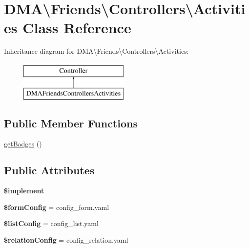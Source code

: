 \hypertarget{classDMA_1_1Friends_1_1Controllers_1_1Activities}{}\section{D\+M\+A\textbackslash{}Friends\textbackslash{}Controllers\textbackslash{}Activities Class Reference}
\label{classDMA_1_1Friends_1_1Controllers_1_1Activities}
Inheritance diagram for D\+M\+A\textbackslash{}Friends\textbackslash{}Controllers\textbackslash{}Activities\+:\begin{figure}[H]
\begin{center}
\leavevmode
\includegraphics[height=2.000000cm]{d4/d37/classDMA_1_1Friends_1_1Controllers_1_1Activities}
\end{center}
\end{figure}
\subsection*{Public Member Functions}
\begin{DoxyCompactItemize}
\item 
\hyperlink{classDMA_1_1Friends_1_1Controllers_1_1Activities_a948fafcbcdac79c1851667216cee1e66}{get\+Badges} ()
\end{DoxyCompactItemize}
\subsection*{Public Attributes}
\begin{DoxyCompactItemize}
\item 
{\bfseries \$implement}
\item 
\hypertarget{classDMA_1_1Friends_1_1Controllers_1_1Activities_a05bd364a981c519d8288a80a0bf816d7}{}{\bfseries \$form\+Config} = \textquotesingle{}config\+\_\+form.\+yaml\textquotesingle{}\label{classDMA_1_1Friends_1_1Controllers_1_1Activities_a05bd364a981c519d8288a80a0bf816d7}

\item 
\hypertarget{classDMA_1_1Friends_1_1Controllers_1_1Activities_ac9c246da820ff83a1c0ffe831421d26f}{}{\bfseries \$list\+Config} = \textquotesingle{}config\+\_\+list.\+yaml\textquotesingle{}\label{classDMA_1_1Friends_1_1Controllers_1_1Activities_ac9c246da820ff83a1c0ffe831421d26f}

\item 
\hypertarget{classDMA_1_1Friends_1_1Controllers_1_1Activities_a816d7d22813eaf0145186ec3ea447bf0}{}{\bfseries \$relation\+Config} = \textquotesingle{}config\+\_\+relation.\+yaml\textquotesingle{}\label{classDMA_1_1Friends_1_1Controllers_1_1Activities_a816d7d22813eaf0145186ec3ea447bf0}

\end{DoxyCompactItemize}


